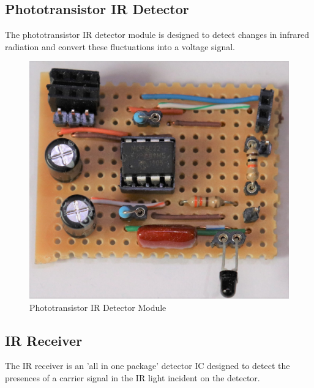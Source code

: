 \subsection{Phototransistor IR Detector}


The phototransistor IR detector module is designed to detect changes in infrared radiation and convert these fluctuations into a voltage signal.

\begin{figure}[H]
	\centering
	\includegraphics[width=.6\textwidth]{figures/modules/phototransistor_receiver.jpg}
	\caption{Phototransistor IR Detector Module}
	\label{fig:module_phototransistor_detector}
\end{figure}








\subsection{IR Receiver}

The IR receiver is an 'all in one package' detector IC designed to detect the presences of a carrier signal in the IR light incident on the detector.

